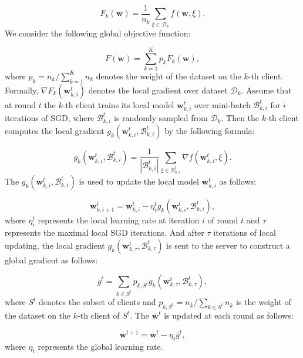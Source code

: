 \documentclass[10pt,journal,compsoc]{IEEEtran}
\newcommand{\w}{\mathbf{w}}
\newcommand{\D}{\mathcal{D}}
\newcommand{\B}{\mathcal{B}}
\begin{document}
\begin{equation}
F_k(\w) = \frac{1}{n_k}\sum_{\xi \in \D_k}f(\w,\xi).
\end{equation}We consider the following global objective function:

\begin{equation}
F(\w) = \sum_{k=1}^K p_kF_k(\w),
\end{equation}where $p_k = n_k/\sum_{k=1}^K n_k$ denotes the weight of the dataset on the $k$-th client. Formally, $\nabla F_k(\w_{k,i}^t)$ denotes the local gradient over dataset $\mathcal{D}_k$. Assume that at round $t$ the $k$-th client trains its local model $\w_{k,i}^{t}$ over mini-batch $\B_{k,i}^{t}$ for $i$ iterations of SGD, where $\B_{k,i}^{t}$ is randomly sampled from $\D_k$. Then the $k$-th client computes the local gradient $g_k(\w_{k,i}^{t},\B_{k,i}^{t})$ by the following formula:

\begin{equation}
g_k(\w_{k,i}^{t},\B_{k,i}^{t}) = \frac{1}{|\B^t_{k,i}|}\sum_{\xi \in \B_{k,i}^{t}}\nabla f(\w_{k,i}^{t},\xi).
\end{equation}The $g_k(\w_{k,i}^{t},\B_{k,i}^{t})$ is used to update the local model $\w_{k,i}^{t}$ as follows:

\begin{equation}\label{localUpdate2}
\w_{k,i+1}^{t} = \w_{k,i}^{t} - \eta_{i}^t g_k(\w_{k,i}^{t},\B_{k,i}^{t}),
\end{equation}where $\eta_{i}^t$ represents the local learning rate at iteration $i$ of round $t$ and $\tau$ represents the maximal local SGD iterations. And after $\tau$ iterations of local updating, the local gradient $g_{k}(\w_{k,\tau}^{t},\B_{k,\tau}^{t})$ is sent to the server to construct a global gradient as follows:

\begin{equation}
\label{aggregation}
\overline{g}^{t} = \sum_{k \in S^{t}}p_{k,S^t} g_k(\w_{k,\tau}^{t},\B_{k,\tau}^{t}), 
\end{equation}where $S^{t}$ denotes the subset of clients and $p_{k,S^t} = n_k/\sum_{k\in S^t}n_k$ is the weight of the dataset on the $k$-th client of $S^t$. The $\overline{\w}^{t}$ is updated at each round as follows:

\begin{equation}
\label{globalUpdate}
\overline{\w}^{t+1} = \overline{\w}^{t} - \eta_t \overline{g}^{t},
\end{equation}where $\eta_t$ represents the global learning rate.
\end{document}
